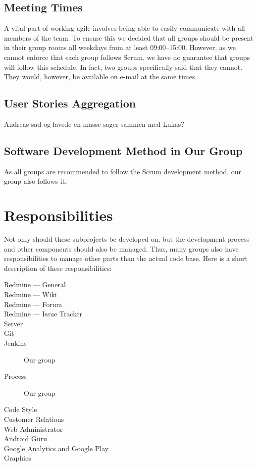 \subsection{Meeting Times}
A vital part of working agile involves being able to easily communicate with all members of the team. To ensure this we decided that all groups should be present in their group rooms all weekdays from at least 09:00--15:00. However, as we cannot enforce that each group follows Scrum, we have no guarantee that groups will follow this schedule. In fact, two groups specifically said that they cannot. They would, however, be available on e-mail at the same times.

\subsection{User Stories Aggregation}
Andreas sad og lavede en masse sager sammen med Lukas?

\subsection{Software Development Method in Our Group}
As all groups are recommended to follow the Scrum development method, our group also follows it.

\section{Responsibilities}\label{sec:responsibilities}
Not only should these subprojects be developed on, but the development process and other components should also be managed. Thus, many groups also have responsibilities to manage other parts than the actual code base. Here is a short description of these responsibilities:

\begin{description}
  \item[Redmine --- General] \dummy \dummy
	\item[Redmine --- Wiki] \dummy \dummy
	\item[Redmine --- Forum] \dummy
	\item[Redmine --- Issue Tracker] \dummy \dummy
	\item[Server] \dummy \dummy
	\item[Git] \dummy \dummy
	\item[Jenkins] Our group
	\item[Process] Our group
	\item[Code Style] \dummy \dummy
	\item[Customer Relations] \dummy \dummy
	\item[Web Administrator] \dummy \dummy
	\item[Android Guru] \dummy \dummy
	\item[Google Analytics and Google Play] \dummy \dummy
	\item[Graphics] \dummy \dummy
\end{description}

